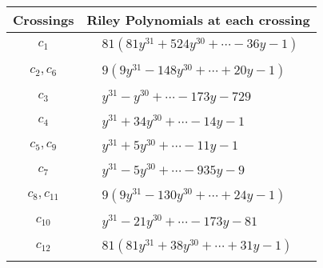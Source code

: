 \documentclass[1p]{elsarticle_modified}
\theoremstyle{definition}
\begin{document}
\begin{tabular}{m{50pt}|m{274pt}}
Crossings & \hspace{64pt}Riley Polynomials at each crossing \\
\hline $$\begin{aligned}c_{1}\end{aligned}$$&$\begin{aligned}
&81(81 y^{31}+524 y^{30}+\cdots-36 y-1)
\end{aligned}$\\
\hline $$\begin{aligned}c_{2},c_{6}\end{aligned}$$&$\begin{aligned}
&9(9 y^{31}-148 y^{30}+\cdots+20 y-1)
\end{aligned}$\\
\hline $$\begin{aligned}c_{3}\end{aligned}$$&$\begin{aligned}
&y^{31}- y^{30}+\cdots-173 y-729
\end{aligned}$\\
\hline $$\begin{aligned}c_{4}\end{aligned}$$&$\begin{aligned}
&y^{31}+34 y^{30}+\cdots-14 y-1
\end{aligned}$\\
\hline $$\begin{aligned}c_{5},c_{9}\end{aligned}$$&$\begin{aligned}
&y^{31}+5 y^{30}+\cdots-11 y-1
\end{aligned}$\\
\hline $$\begin{aligned}c_{7}\end{aligned}$$&$\begin{aligned}
&y^{31}-5 y^{30}+\cdots-935 y-9
\end{aligned}$\\
\hline $$\begin{aligned}c_{8},c_{11}\end{aligned}$$&$\begin{aligned}
&9(9 y^{31}-130 y^{30}+\cdots+24 y-1)
\end{aligned}$\\
\hline $$\begin{aligned}c_{10}\end{aligned}$$&$\begin{aligned}
&y^{31}-21 y^{30}+\cdots-173 y-81
\end{aligned}$\\
\hline $$\begin{aligned}c_{12}\end{aligned}$$&$\begin{aligned}
&81(81 y^{31}+38 y^{30}+\cdots+31 y-1)
\end{aligned}$\\
\hline
\end{tabular}\\~\\
\end{document}

